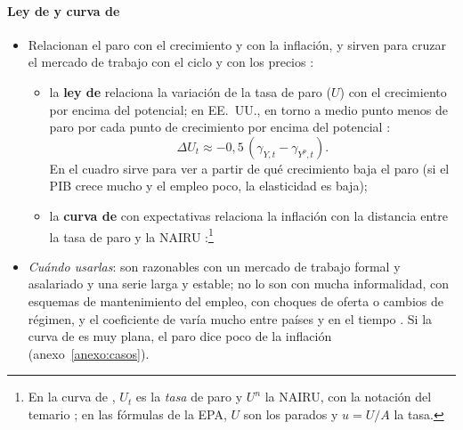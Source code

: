 \documentclass[11pt]{article}
\begin{document}
\paragraph{Ley de  y curva de }
\begin{itemize}
\item Relacionan el paro con el crecimiento y con la inflación, y sirven para cruzar el mercado de trabajo con el ciclo y con los precios :
  \begin{itemize}
  \item la \textbf{ley de } relaciona la variación de la tasa de paro ($U$) con el crecimiento por encima del potencial; en EE.~UU., en torno a medio punto menos de paro por cada punto de crecimiento por encima del potencial \parencite{Okun1962}:
\begin{equation}\label{eq:okun}
\Delta U_t\approx-0{,}5\,(\gamma_{Y,t}-\gamma_{Y^p,t}) .
\end{equation}
  En el cuadro sirve para ver a partir de qué crecimiento baja el paro (si el PIB crece mucho y el empleo poco, la elasticidad es baja);
  \item la \textbf{curva de } con expectativas relaciona la inflación con la distancia entre la tasa de paro y la NAIRU \parencite{Phillips1958}:\footnote{En la curva de , $U_t$ es la \emph{tasa} de paro y $U^n$ la NAIRU, con la notación del temario ; en las fórmulas de la EPA, $U$ son los parados y $u=U/A$ la tasa.}
  \end{itemize}
\item \emph{Cuándo usarlas}: son razonables con un mercado de trabajo formal y asalariado y una serie larga y estable; no lo son con mucha informalidad, con esquemas de mantenimiento del empleo, con choques de oferta o cambios de régimen, y el coeficiente de  varía mucho entre países y en el tiempo \parencite{Ball2017Okun}. Si la curva de  es muy plana, el paro dice poco de la inflación (anexo~\ref{anexo:casos}).
\end{itemize}
\end{document}
